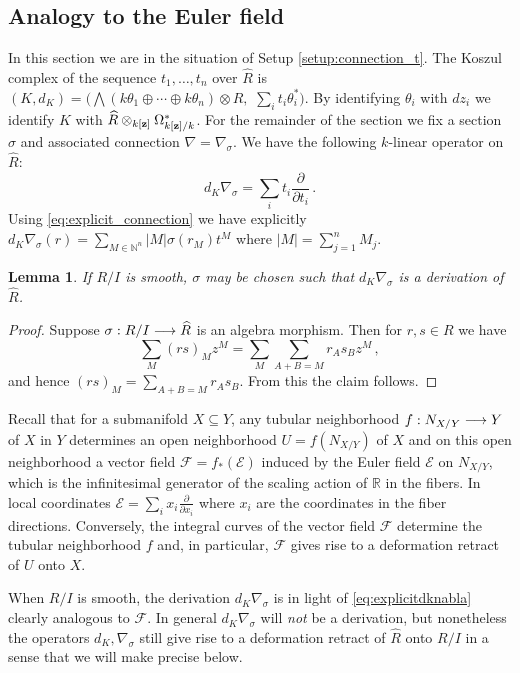 \documentclass[english,letter paper,12pt,leqno]{article}
\newtheorem{lemma}[theorem]{Lemma}
\theoremstyle{example}
\numberwithin{equation}{section}
\def\be{\begin{equation}}
\def\ee{\end{equation}}
\begin{document}
\subsection{Analogy to the Euler field}\label{section:more_on_connections}

In this section we are in the situation of Setup \ref{setup:connection_t}. The Koszul complex of the sequence $t_1,\ldots,t_n$ over $\widehat{R}$ is $(K, d_K) = \big( \bigwedge( k \theta_1 \oplus \cdots \oplus k \theta_n ) \otimes \widehat{R}, \,\,\sum_i t_i \theta_i^* \big)$. By identifying $\theta_i$ with $dz_i$ we identify $K$ with $\widehat{R} \otimes_{k[\bold{z}]} \Omega^*_{k[\bold{z}]/k}$. For the remainder of the section we fix a section $\sigma$ and associated connection $\nabla = \nabla_\sigma$. We have the following $k$-linear operator on $\widehat{R}$:
\be\label{eq:explicitdknabla}
d_K \nabla_\sigma = \sum_i t_i \frac{\partial}{\partial t_i}\,.
\ee
Using \eqref{eq:explicit_connection} we have explicitly $d_K \nabla_\sigma(r) = \sum_{M \in \mathbb{N}^n} |M| \sigma(r_M) t^M$ where $|M| = \sum_{j=1}^n M_j$.

\begin{lemma} If $R/I$ is smooth, $\sigma$ may be chosen such that $d_K \nabla_\sigma$ is a derivation of $\widehat{R}$.
\end{lemma}
\begin{proof}
Suppose $\sigma: R/I \longrightarrow \widehat{R}$ is an algebra morphism. Then for $r,s \in R$ we have
\[
\sum_M (rs)_M z^M = \sum_M \sum_{A + B = M} r_As_B z^M\,,
\]
and hence $(rs)_M = \sum_{A+B = M} r_A s_B$. From this the claim follows.
\end{proof}

Recall that for a submanifold $X \subseteq Y$, any tubular neighborhood $f: N_{X/Y} \longrightarrow Y$ of $X$ in $Y$ determines an open neighborhood $U = f(N_{X/Y})$ of $X$ and on this open neighborhood a vector field $\mathscr{F} = f_*(\mathscr{E})$ induced by the Euler field $\mathscr{E}$ on $N_{X/Y}$, which is the infinitesimal generator of the scaling action of $\mathbb{R}$ in the fibers. In local coordinates $\mathscr{E} = \sum_i x_i \frac{\partial}{\partial x_i}$ where $x_i$ are the coordinates in the fiber directions. Conversely, the integral curves of the vector field $\mathscr{F}$ determine the tubular neighborhood $f$ \cite[\S 2.3]{burs} and, in particular, $\mathscr{F}$ gives rise to a deformation retract of $U$ onto $X$.

When $R/I$ is smooth, the derivation $d_K \nabla_\sigma$ is in light of \eqref{eq:explicitdknabla} clearly analogous to $\mathscr{F}$. In general $d_K \nabla_\sigma$ will \emph{not} be a derivation, but nonetheless the operators $d_K, \nabla_\sigma$ still give rise to a deformation retract of $\widehat{R}$ onto $R/I$ in a sense that we will make precise below.
\end{document}
